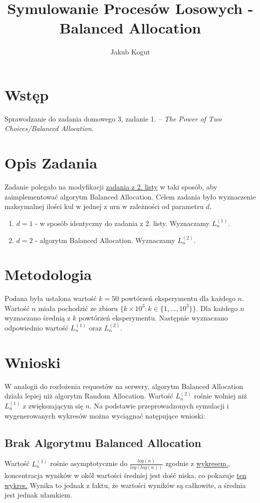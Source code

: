 \documentclass{article}
\title{Symulowanie Procesów Losowych - Balanced Allocation}
\author{Jakub Kogut}
\date{}
\begin{document}
\maketitle

\section{Wstęp}
Sprawodzanie do zadania domowego 3, zadanie 1. -- \textit{The Power of Two Choices/Balanced Allocation}.
\section{Opis Zadania}
Zadanie polegało na modyfikacji \href{https://github.com/niooch/ballsAndBins}{zadania z 2. listy} w taki sposób, aby zaimplementować algorytm Balanced Allocation. \newline
Celem zadania było wyznaczenie maksymalnej ilości kul w jednej z urn w zależności od parametru $d$.
\begin{enumerate}
    \item $d=1$ - w sposób identyczny do zadania z 2. listy. Wyznaczamy $L_n^{(1)}$.
    \item $d=2$ - algorytm Balanced Allocation. Wyznaczamy $L_n^{(2)}$.
\end{enumerate}
\section{Metodologia}
Podana była ustalona wartość $k=50$ powtórzeń eksperymentu dla każdego $n$. Wartość $n$ miała pochodzić ze zbioru $\{k \times 10^3: k \in \{1, ..., 10^3\}\}$. Dla każdego $n$ wyznaczano średnią z $k$ powtórzeń eksperymentu. Następnie wyznaczano odpowiednio wartość $L_n^{(1)}$ oraz $L_n^{(2)}$.
\section{Wnioski}
W analogii do rozłożenia requestów na serwery, algorytm Balanced Allocation działa lepiej niż algorytm Random Allocation. Wartość $L_n^{(2)}$ rośnie wolniej niż $L_n^{(1)}$ z zwiększającym się $n$. \newline
Na podstawie przeprowadzonych symulacji i wygenerowanych wykresów można wyciągnać natępujące wnioski:
\subsection{Brak Algorytmu Balanced Allocation}
Wartość $L_n^{(1)}$ rośnie asymptotycznie do $\frac{log(n)}{log(log(n))}$ zgodnie z \href{fig:Ln1}{wykresem.}, koncentracja wyników w okół wartości średniej jest dość niska, co pokazuje \href{fig:LnA}{ten wykres.} Wynika to jednak z faktu, że wartości wyników są całkowite, a średnia jest jednak ułamkiem.
\end{document}
